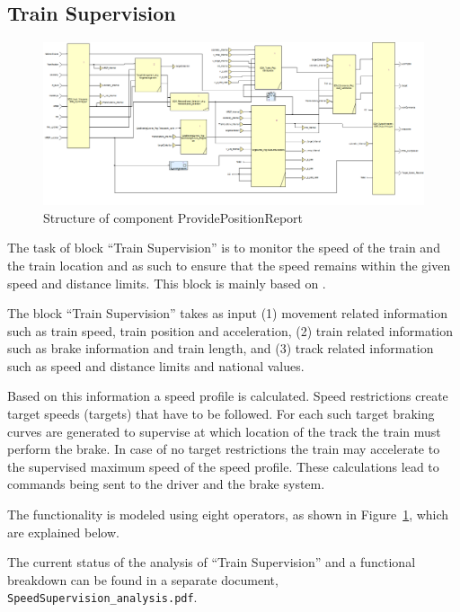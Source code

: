 \subsection{Train Supervision}

\begin{figure}
\centering
\includegraphics[width=0.95\textheight, angle=90]{../images/speedsupervision.png}
\caption{Structure of component ProvidePositionReport}\label{fig:ssv}
\end{figure}

The task of block ``Train Supervision'' is to monitor the speed of the train and the train location and as such to ensure that the speed remains within the given speed and distance limits. This block is mainly based on \cite[Chapt.~3.13]{subset-026}.

The block ``Train Supervision'' takes as input (1) movement related information such as train speed, train position and acceleration, (2) train related information such as brake information and train length, and (3) track related information such as speed and distance limits and national values.

Based on this information a speed profile is calculated. Speed restrictions create target speeds (targets) that have to be followed. For each such target braking curves are generated to supervise at which location of the track the train must perform the brake. In case of no target restrictions the train may accelerate to the supervised maximum speed of the speed profile. These calculations lead to commands being sent to the driver and the brake system.

The functionality is modeled using eight operators, as shown in Figure~\ref{fig:ssv}, which are explained below.

The current status of the analysis of ``Train Supervision'' and a functional breakdown can be found in a separate document, \verb+SpeedSupervision_analysis.pdf+.



